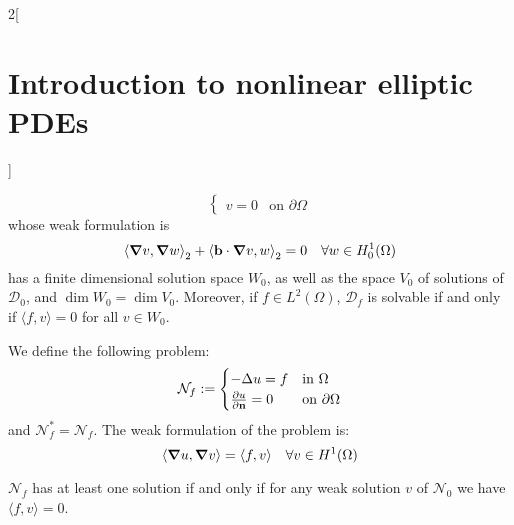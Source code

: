 \documentclass[../../../main_math.tex]{subfiles}
\begin{document}
\begin{multicols}{2}[\section{Introduction to nonlinear elliptic PDEs}]
\begin{proposition}
$$\begin{cases}
        v=0    & \text{on }\partial\Omega
      \end{cases}
    $$
    whose weak formulation is
    \begin{equation*}
      {\langle \grad v,\grad w\rangle}_2+{\langle \boldsymbol{\mathrm{b}}\cdot \grad v,w\rangle}_2=0\quad \forall w\in H_0^1(\Omega)
    \end{equation*}
    has a finite dimensional solution space $W_0$, as well as the space $V_0$ of solutions of $\mathcal{D}_0$, and $\dim W_0=\dim V_0$. Moreover, if $f\in L^2(\Omega)$, $\mathcal{D}_f$ is solvable if and only if $\langle f,v\rangle=0$ for all $v\in W_0$.
  \end{proposition}
  \begin{proposition}

  \end{proposition}
  \begin{definition}
    We define the following problem:
    $$
      \mathcal{N}_f:=\begin{cases}
        -\Delta u=f   & \text{in }\Omega         \\
        \pdv{u}{\boldsymbol{\mathrm{n}}}=0 & \text{on }\partial\Omega
      \end{cases}
    $$
    and $\mathcal{N}_f^*=\mathcal{N}_f$. The weak formulation of the problem is:
    \begin{equation*}
      \langle \grad u,\grad v\rangle=\langle f,v\rangle\quad \forall v\in H^1(\Omega)
    \end{equation*}
  \end{definition}
  \begin{proposition}
    $\mathcal{N}_f$ has at least one solution if and only if for any weak solution $v$ of $\mathcal{N}_0$ we have $\langle f,v\rangle=0$.
  \end{proposition}

\end{multicols}
\end{document}
